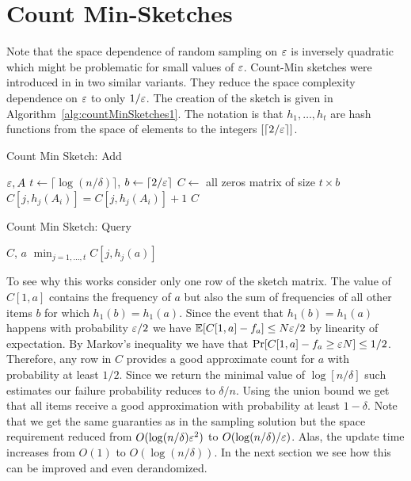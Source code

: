 \section{Count Min-Sketches}
Note that the space dependence of random sampling on $\varepsilon$ is inversely quadratic which might be problematic for small values of $\varepsilon$. 
Count-Min sketches were introduced in \cite{CormodeM05}\cite{MankuM02} in two similar variants.
They reduce the space complexity dependence on $\varepsilon$ to only $1/\varepsilon$.
The creation of the sketch is given in Algorithm~\ref{alg:countMinSketches1}.
The notation is that $h_1,\ldots,h_t$ are hash functions from the space of elements to the integers $[\lceil 2/\varepsilon \rceil]$.
\begin{algorithm}
\caption{Count Min Sketch: Add}
\label{alg:countMinSketchesAdd}
\begin{algorithmic}
 $\varepsilon, A$ 
\STATE $t \leftarrow \lceil \log(n/\delta) \rceil$, $b \leftarrow \lceil 2/\varepsilon \rceil$
\STATE $C \leftarrow$ all zeros matrix of size $t \times b$
		\STATE $C[j,h_j(A_i)] = C[j,h_j(A_i)] + 1$
	\ENDFOR
\ENDFOR
{} $C$ 
\end{algorithmic}
\end{algorithm}
%
\begin{algorithm}
\caption{Count Min Sketch: Query}
\label{alg:countMinSketchesQuery}
\begin{algorithmic}
 $C$, $a$ 
 $\min_{j=1,\ldots,t} C[j,h_j(a)]$ 
\end{algorithmic}
\end{algorithm}

To see why this works consider only one row of the sketch matrix.
The value of $C[1,a]$ contains the frequency of $a$ but also the sum of frequencies of all other items $b$ for which $h_1(b) = h_1(a)$.
Since the event that $h_1(b) = h_1(a)$ happens with probability $\varepsilon/2$ we have ${\mathbb E}[C[1,a]  - f_a] \le N\varepsilon/2$ by linearity of expectation. 
By Markov's inequality we have that $\Pr[C[1,a] - f_a \ge \varepsilon N] \le 1/2$.
Therefore, any row in $C$ provides a good approximate count for $a$ with probability at least $1/2$.
Since we return the minimal value of $\log[n/\delta]$ such estimates our failure probability reduces to $\delta/n$.
Using the union bound we get that all items receive a good approximation with probability at least $1-\delta$.
Note that we get the same guaranties as in the sampling solution but the space requirement reduced from 
$O(\log(n/\delta)\varepsilon^2)$ to $O(\log(n/\delta)/\varepsilon)$. Alas, the update time increases from $O(1)$ to $O(\log(n/\delta))$.
In the next section we see how this can be improved and even derandomized.

